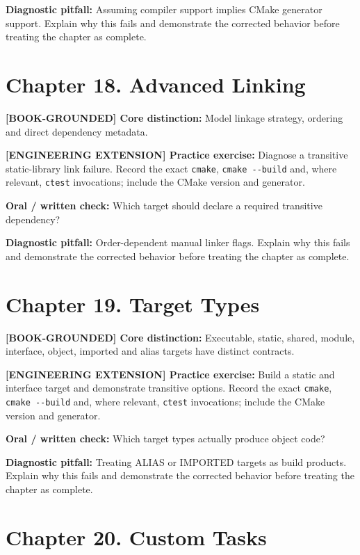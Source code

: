 \documentclass[11pt,letterpaper,oneside]{report}
\providecommand{\passthrough}[1]{#1}
\begin{document}
\textbf{Diagnostic pitfall:} Assuming compiler support implies CMake
generator support. Explain why this fails and demonstrate the corrected
behavior before treating the chapter as complete.

\section{Chapter 18. Advanced
Linking}\label{chapter-18.-advanced-linking}

\textbf{{[}BOOK-GROUNDED{]} Core distinction:} Model linkage strategy,
ordering and direct dependency metadata.

\textbf{{[}ENGINEERING EXTENSION{]} Practice exercise:} Diagnose a
transitive static-library link failure. Record the exact
\passthrough{\lstinline!cmake!}, \passthrough{\lstinline!cmake --build!}
and, where relevant, \passthrough{\lstinline!ctest!} invocations;
include the CMake version and generator.

\textbf{Oral / written check:} Which target should declare a required
transitive dependency?

\textbf{Diagnostic pitfall:} Order-dependent manual linker flags.
Explain why this fails and demonstrate the corrected behavior before
treating the chapter as complete.

\section{Chapter 19. Target Types}\label{chapter-19.-target-types}

\textbf{{[}BOOK-GROUNDED{]} Core distinction:} Executable, static,
shared, module, interface, object, imported and alias targets have
distinct contracts.

\textbf{{[}ENGINEERING EXTENSION{]} Practice exercise:} Build a static
and interface target and demonstrate transitive options. Record the
exact \passthrough{\lstinline!cmake!},
\passthrough{\lstinline!cmake --build!} and, where relevant,
\passthrough{\lstinline!ctest!} invocations; include the CMake version
and generator.

\textbf{Oral / written check:} Which target types actually produce
object code?

\textbf{Diagnostic pitfall:} Treating ALIAS or IMPORTED targets as build
products. Explain why this fails and demonstrate the corrected behavior
before treating the chapter as complete.

\section{Chapter 20. Custom Tasks}\label{chapter-20.-custom-tasks}
\end{document}
